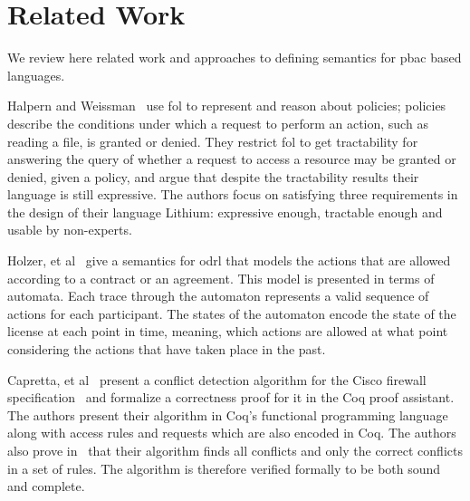 \documentclass[runningheads,a4paper]{llncs}
\begin{document}
\section{Related Work}
We review here related work and approaches
to defining semantics for \ac{pbac} based languages.
 
Halpern and Weissman~\cite{Halpern2008} use \ac{fol} to represent and reason about policies; policies describe the conditions under which a request to perform an action, such as reading a file, is granted or denied. They restrict \ac{fol} to get tractability for answering the query of whether a request to access a resource may be granted or denied, given a policy, and argue that despite the tractability results their language is still expressive. The authors focus on satisfying three requirements in the design of their language Lithium: expressive enough, tractable enough and usable by non-experts.

Holzer, et al~\cite{Holzer} give a semantics for \ac{odrl} that models the actions that are allowed according to a contract or an agreement. This model is presented in terms of automata. Each trace through the automaton represents a valid sequence of actions for each participant. The states of the automaton encode the state of the license at each point in time, meaning, which actions are allowed at what point considering the actions that have taken place in the past. 


Capretta, et al~\cite{CaprettaSFM07} present a conflict detection algorithm for the Cisco firewall specification~\cite{ciscofirewall} and formalize a correctness proof for it in the Coq proof assistant. The authors present their algorithm in Coq's functional programming language along with access rules and requests which are also encoded in Coq. The authors also prove in~\cite{CaprettaSFM07} that their algorithm finds all conflicts and only the correct conflicts in a set of rules. The algorithm is therefore verified formally to be both sound and complete.
\end{document}

